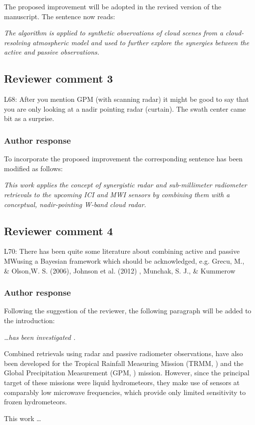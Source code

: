 \documentclass[11pt]{scrartcl}
\begin{document}
The proposed improvement will be adopted in the revised version of the manuscript.
The sentence now reads:

{\itshape The algorithm is applied to synthetic observations of cloud scenes from
  a cloud-resolving atmospheric model and used to further explore the synergies
  between the active and passive observations.}


\textit{}

\subsection*{Reviewer comment 3}

L68:  After you mention GPM (with scanning radar) it might be good to say that you are only looking at a nadir pointing radar (curtain).  The swath center came bit as a surprise.

\subsubsection*{Author response}

To incorporate the proposed improvement the corresponding sentence has been
modified as follows:

{\itshape This work applies the concept of synergistic radar and sub-millimeter radiometer
retrievals to the upcoming ICI and MWI sensors by combining them with a
conceptual, nadir-pointing W-band cloud radar.}

\subsection*{Reviewer comment 4}

L70:  There has been quite some literature about combining active and passive MWusing a Bayesian framework which should be acknowledged, e.g. Grecu, M., \& Olson,W. S. (2006), Johnson et al. (2012) , Munchak, S. J., \& Kummerow

\subsubsection*{Author response}

Following the suggestion of the reviewer, the following paragraph will be added to the introduction:

{\itshape
\ldots has been
investigated \citep{evans05, jiang19}.

Combined retrievals using radar and passive radiometer observations, have also
been developed for the Tropical Rainfall Measuring Mission (TRMM,
\citet{kummerow98, grecu04}) and the Global Precipitation Measurement (GPM,
\citet{hou14, grecu16, munchak11}) mission. However, since the principal target
of these missions were liquid hydrometeors, they make use of sensors at
comparably low microwave frequencies, which provide only limited sensitivity to
frozen hydrometeors.

This work \ldots
}
\end{document}
